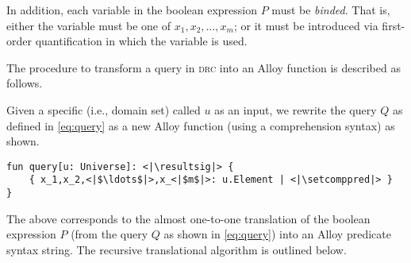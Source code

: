 In addition, each variable in the boolean expression $P$ must be \emph{binded}. That is, either the variable must be one of $x_1,x_2,\ldots,x_m$; or it must be introduced via first-order quantification in which the variable is used.

\smallskip
The procedure to transform a query in \textsc{drc} into an Alloy function is described as follows.

\smallskip
\begin{procedure}
    \label{proc:query-function}
    Given a specific  (i.e., domain set) called $u$ as an input, we rewrite the query $Q$ as defined in \eqref{eq:query} as a new Alloy function (using a comprehension syntax) as shown.

    \newrobustcmd{}
    \newrobustcmd{}
    \newrobustcmd{}

\begin{lstlisting}[language=alloy,numbers=none]
fun query[u: Universe]: <|\resultsig|> {
    { x_1,x_2,<|$\ldots$|>,x_<|$m$|>: u.Element | <|\setcomppred|> }
}
\end{lstlisting}
    The \setcomppred{} above corresponds to the almost one-to-one translation of the boolean expression $P$ (from the query $Q$ as shown in \eqref{eq:query}) into an Alloy predicate syntax string. The recursive translational algorithm is outlined below.


\end{procedure}
